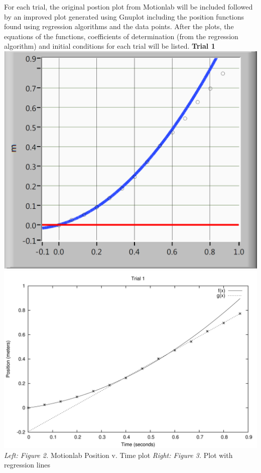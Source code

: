 \documentclass[12pt,letterpaper]{article}
\begin{document}
For each trial, the original postion plot from Motionlab will be included followed by an improved plot generated using Gnuplot including the position functions found using regression algorithms and the data points. After the plots, the equations of the functions, coefficients of determination (from the regression algorithm) and initial conditions for each trial will be listed. 
\newline\newline
\textbf{Trial 1}
\newline\newline
\includegraphics[scale=0.43]{t1p.PNG}
\includegraphics[scale=0.7]{1.png}
\textit{Left: Figure 2.} Motionlab Position v. Time plot \textit{Right: Figure 3.} Plot with regression lines
\newline
\end{document}
